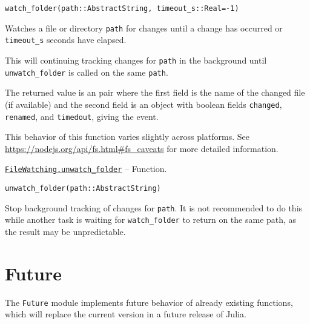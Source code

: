 \begin{adjustwidth}{2em}{0pt}


\begin{verbatim}
watch_folder(path::AbstractString, timeout_s::Real=-1)
\end{verbatim}

Watches a file or directory \texttt{path} for changes until a change has occurred or \texttt{timeout\_s} seconds have elapsed.

This will continuing tracking changes for \texttt{path} in the background until \texttt{unwatch\_folder} is called on the same \texttt{path}.

The returned value is an pair where the first field is the name of the changed file (if available) and the second field is an object with boolean fields \texttt{changed}, \texttt{renamed}, and \texttt{timedout}, giving the event.

This behavior of this function varies slightly across platforms. See \href{https://nodejs.org/api/fs.html\#fs\_caveats}{https://nodejs.org/api/fs.html\#fs\_caveats} for more detailed information.



\end{adjustwidth}
\hypertarget{18277052083824325968}{}
\hyperlink{18277052083824325968}{\texttt{FileWatching.unwatch\_folder}}  -- {Function.}

\begin{adjustwidth}{2em}{0pt}


\begin{verbatim}
unwatch_folder(path::AbstractString)
\end{verbatim}

Stop background tracking of changes for \texttt{path}. It is not recommended to do this while another task is waiting for \texttt{watch\_folder} to return on the same path, as the result may be unpredictable.



\end{adjustwidth}

\hypertarget{15245837109633420177}{}


\chapter{Future}



The \texttt{Future} module implements future behavior of already existing functions, which will replace the current version in a future release of Julia.


